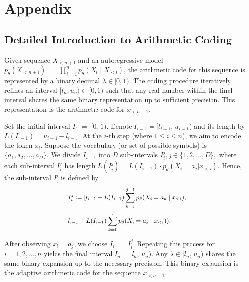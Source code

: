 \documentclass[11pt]{article}
\begin{document}
\appendix

\section{Appendix}
\label{sec:appendix}
\subsection{Detailed Introduction to Arithmetic Coding}
\label{sec:detailed_intro_to_ac}
Given sequence \(X_{<n+1}\) and an autoregressive model $ p_{\theta}(X_{<n+1}) \;=\; \displaystyle\prod_{i=1}^{n} p_{\theta}(X_i \mid X_{<i})$, the arithmetic code for this sequence is represented by a binary decimal \(\lambda \in [0,1)\). The coding procedure iteratively refines an interval \([l_n, u_n)\subset [0,1)\) such that any real number within the final interval shares the same binary representation up to sufficient precision. This representation is the arithmetic code for \(x_{<n+1}\). 

Set the initial interval 
$
I_0 \;=\; [0,\, 1).
$
Denote \(I_{i-1} = [l_{i-1},\, u_{i-1})\) and its length by \(L(I_{i - 1}) = u_{i-1} - l_{i-1}\).
At the \(i\)-th step (where \(1 \le i \le n\)), we aim to encode the token \(x_i\). Suppose the vocabulary (or set of possible symbols) is \(\{a_1, a_2, \dots, a_D\}\). We divide \(I_{i-1}\) into \(D\) sub-intervals
$
I_i^j,j \in \{1,2,\dots,D\},
$
where each sub-interval \(I_i^j\) has length
$
L(I_i^j)=L(I_{i - 1}) \cdot p_{\theta}(X_i = a_j | x_{<i}).
$
Hence, the sub-interval \(I_i^j\) is defined by
\begin{equation}
    \small
    \begin{aligned}
     &I_i^j :=[l_{i-1} + L(I_{i - 1})\sum_{k=1}^{j-1}p_{\theta}(X_i = a_k \mid x_{<i}),\\
     &l_{i-1} + L(I_{i - 1})\sum_{k=1}^{j}p_{\theta}(X_i = a_k \mid x_{<i})).
    \end{aligned}
\end{equation}

After observing \(x_i = a_j\), we choose 
$
I_i \;=\; I_i^j.
$
Repeating this process for \(i=1,2,\dots,n\) yields the final interval 
$
I_n = [l_n,\, u_n).
$
Any \(\lambda \in [l_n,\, u_n)\) shares the same binary expansion up to the necessary precision. This binary expansion is the adaptive arithmetic code for the sequence \(x_{<n+1}\).
\end{document}
